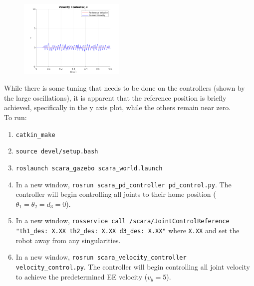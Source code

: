 \documentclass[10pt]{article}
\begin{document}
\begin{enumerate}
	\begin{figure}[H]
		\centering
		\includegraphics[width=0.45\textwidth]{figures/vel-vz-plot1.png}
	\end{figure}
	
	While there is some tuning that needs to be done on the controllers (shown by the large oscillations), it is apparent that the reference position is briefly achieved, specifically in the y axis plot, while the others remain near zero.
	\\
	
	To run:
	\begin{enumerate}
		\item \texttt{catkin\_make}
		\item \texttt{source devel/setup.bash}
		\item \texttt{roslaunch scara\_gazebo scara\_world.launch}
		\item In a new window, \texttt{rosrun scara\_pd\_controller pd\_control.py}. The controller will begin controlling all joints to their home position ($\theta_1 = \theta_2 = d_3 = 0$).
		\item In a new window, \texttt{rosservice call /scara/JointControlReference "th1\_des: X.XX th2\_des: X.XX d3\_des: X.XX"} where \texttt{X.XX} and set the robot away from any singularities.
		\item In a new window, \texttt{rosrun scara\_velocity\_controller velocity\_control.py}. The controller will begin controlling all joint velocity to achieve the predetermined EE velocity ($v_y = 5$).
	\end{enumerate}
\end{enumerate}
\end{document}

